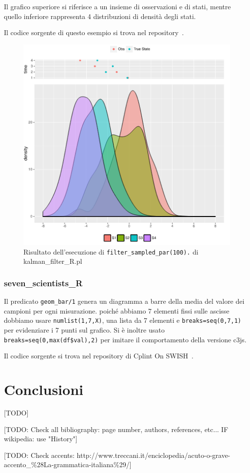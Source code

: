 \documentclass[10pt,titlepage,twoside,a4paper]{report}
\begin{document}
Il grafico superiore si riferisce a un insieme di osservazioni e di stati, 
mentre quello inferiore rappresenta 4  distribuzioni di densità degli stati.

Il codice sorgente di questo esempio si trova nel repository~\cite{kalmanFilterRpl}.

\begin{figure}[H]
\centering
\caption{Risultato dell'esecuzione di \texttt{filter\_sampled\_par(100).} di kalman\_filter\_R.pl}
\includegraphics[width=.5\linewidth]{kalman_filter_R_plot.png}
\end{figure}

\subsection{seven\_scientists\_R}
Il predicato \texttt{geom\_bar/1}  genera un diagramma a barre 
della media del valore dei campioni per ogni misurazione. poiché 
abbiamo 7 elementi fissi sulle ascisse dobbiamo usare \texttt{numlist(1,7,X)}, 
una lista da 7 elementi e \texttt{breaks=seq(0,7,1)} per evidenziare i 7 
punti sul grafico. Si è inoltre usato \texttt{breaks=seq(0,max(df\$val),2)} 
per imitare il comportamento della versione c3js.

Il codice sorgente si trova nel repository di Cplint On 
SWISH~\cite{sevenScientistsRpl}.




\chapter{Conclusioni}

[TODO]


[TODO: Check all bibliography: page number, authors, references, etc...
       IF wikipedia: use "History"]

[TODO: Check accents: http://www.treccani.it/enciclopedia/acuto-o-grave-accento\_\%28La-grammatica-italiana\%29/]

\printbibliography
\end{document}
